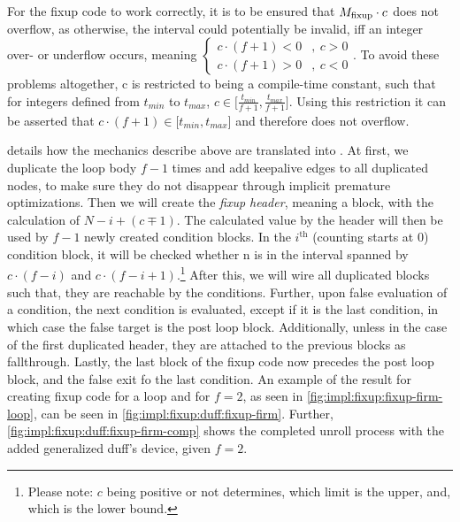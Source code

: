

For the fixup code to work correctly, it is to be ensured that $M_{\text{fixup}} \cdot c$ does not overflow, as otherwise, the interval \cinterval could potentially be invalid, iff an integer over- or underflow occurs, meaning $
\begin{cases}
    c \cdot (f + 1) < 0 &, \medspace c > 0\\
    c \cdot (f + 1) > 0 &, \medspace c < 0
\end{cases}$.
To avoid these problems altogether, c is restricted to being a compile-time constant, such that for integers defined from $t_{min}$ to $t_{max}$, $c \in \lbrack \frac{t_{min}}{f + 1}, \frac{t_{max}}{f + 1} \rbrack$.
Using this restriction it can be asserted that $c \cdot (f + 1) \in \lbrack t_{min}, t_{max} \rbrack$ and therefore does not overflow.

 details how the mechanics describe above are translated into \libFIRM.
At first, we duplicate the loop body $f - 1$ times and add keepalive edges to all duplicated nodes, to make sure they do not disappear through implicit premature optimizations.
Then we will create the \textit{fixup header}, meaning a block, with the calculation of $N - i + (c \mp 1)$.
The calculated value by the header will then be used by $f - 1$ newly created condition blocks.
In the $i^{\text{th}}$ (counting starts at 0) condition block, it will be checked whether n is in the interval spanned by $c \cdot (f - i)$ and  $c \cdot (f - i + 1)$.\footnote{Please note: $c$ being positive or not determines, which limit is the upper, and, which is the lower bound.}
After this, we will wire all duplicated blocks such that, they are reachable by the conditions.
Further, upon false evaluation of a condition, the next condition is evaluated, except if it is the last condition, in which case the false target is the post loop block.
Additionally, unless in the case of the first duplicated header, they are attached to the previous blocks as fallthrough.
Lastly, the last block of the fixup code now precedes the post loop block, and the false exit fo the last condition.
An example of the result for creating fixup code for a loop and for $f = 2$, as seen in \cref{fig:impl:fixup:fixup-firm-loop}, can be seen in \cref{fig:impl:fixup:duff:fixup-firm}.
Further, \cref{fig:impl:fixup:duff:fixup-firm-comp} shows the completed unroll process with the added generalized duff's device, given $f = 2$.



